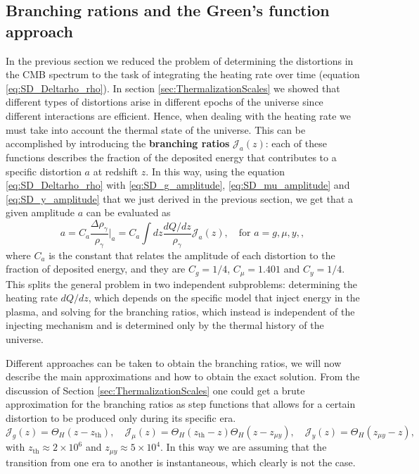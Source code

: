 \subsection{Branching rations and the Green's function approach}
\label{sec:branching_ratios}
In the previous section we reduced the problem of determining the distortions in the CMB spectrum to the task of integrating the heating rate over time (equation \eqref{eq:SD_Deltarho_rho}). In section \ref{sec:ThermalizationScales} we showed that different types of distortions arise in different epochs of the universe since different interactions are efficient. Hence, when dealing with the heating rate we must take into account the thermal state of the universe. This can be accomplished by introducing the \textbf{branching ratios} $\mathcal{J}_a(z)$: each of these functions describes the fraction of the deposited energy that contributes to a specific distortion $a$ at redshift $z$. In this way, using the equation \eqref{eq:SD_Deltarho_rho} with \eqref{eq:SD_g_amplitude}, \eqref{eq:SD_mu_amplitude} and \eqref{eq:SD_y_amplitude} that we just derived in the previous section, we get that a given amplitude $a$ can be evaluated as
\begin{equation}
    a=C_a\frac{\Delta\rho_\gamma}{\rho_\gamma}\bigg|_a=C_a\int dz\frac{dQ/dz}{\rho_\gamma}\mathcal{J}_a(z),\quad\text{for } a=g,\mu,y,\label{eq:SD_amplitude_branching},
\end{equation}
where $C_a$ is the constant that relates the amplitude of each distortion to the fraction of deposited energy, and they are $C_g=1/4$, $C_\mu=1.401$ and $C_y=1/4$.\\
This splits the general problem in two independent subproblems: determining the heating rate $d Q/dz$, which depends on the specific model that inject energy in the plasma, and solving for the branching ratios, which instead is independent of the injecting mechanism and is determined only by the thermal history of the universe.

Different approaches can be taken to obtain the branching ratios, we will now describe the main approximations and how to obtain the exact solution. From the discussion of Section \ref{sec:ThermalizationScales} one could get a brute approximation for the branching ratios as step functions that allows for a certain distortion to be produced only during its specific era.
\begin{equation}
    \mathcal{J}_g(z)=\Theta_{H}(z-z_\text{th}),\quad \mathcal{J}_\mu(z)=\Theta_{H}(z_\text{th}-z)\Theta_{H}(z-z_{\mu y}),\quad \mathcal{J}_y(z)=\Theta_{H}(z_{\mu y}-z),
\end{equation}
with $z_\text{th}\approx2\times10^6$ and $z_{\mu y}\approx5\times10^4$.
In this way we are assuming that the transition from one era to another is instantaneous, which clearly is not the case. 

